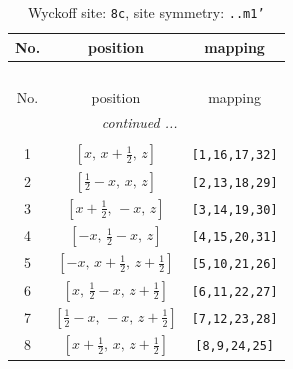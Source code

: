 \documentclass[fleqn,8pt]{jsarticle}
\begin{document}
\renewcommand{\arraystretch}{1.2}
\begin{longtable}{ccc}
\caption{Wyckoff site: {\tt 8c}, site symmetry: {\tt ..m1'}}
 \\
 \hline \hline
No. & position & mapping \\ \hline \endfirsthead

\multicolumn{2}{l}{\tablename\ \thetable{}} \\
 \hline \hline
No. & position & mapping \\ \hline \endhead

 \hline \hline
\multicolumn{2}{r}{\footnotesize\it continued ...} \\ \endfoot

 \hline \hline
\multicolumn{2}{r}{} \\ \endlastfoot

1 & $\left[ x,\, x + \frac{1}{2},\, z \right]$ & {\tt [1,16,17,32]} \\ \hline
2 & $\left[ \frac{1}{2} - x,\, x,\, z \right]$ & {\tt [2,13,18,29]} \\ \hline
3 & $\left[ x + \frac{1}{2},\, - x,\, z \right]$ & {\tt [3,14,19,30]} \\ \hline
4 & $\left[ - x,\, \frac{1}{2} - x,\, z \right]$ & {\tt [4,15,20,31]} \\ \hline
5 & $\left[ - x,\, x + \frac{1}{2},\, z + \frac{1}{2} \right]$ & {\tt [5,10,21,26]} \\ \hline
6 & $\left[ x,\, \frac{1}{2} - x,\, z + \frac{1}{2} \right]$ & {\tt [6,11,22,27]} \\ \hline
7 & $\left[ \frac{1}{2} - x,\, - x,\, z + \frac{1}{2} \right]$ & {\tt [7,12,23,28]} \\ \hline
8 & $\left[ x + \frac{1}{2},\, x,\, z + \frac{1}{2} \right]$ & {\tt [8,9,24,25]} \\
\end{longtable}
\renewcommand{\arraystretch}{1.2}
\end{document}
